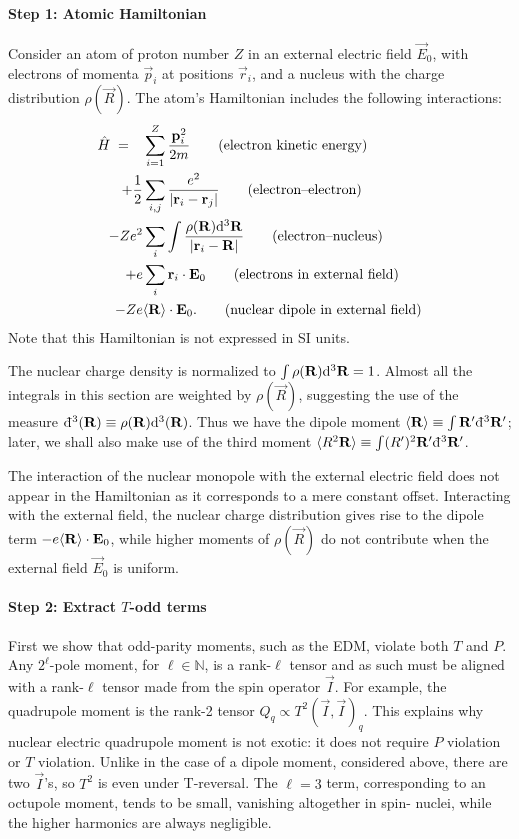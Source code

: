 \paragraph{Step 1: Atomic Hamiltonian}

Consider an atom of proton number $Z$ in an external electric field $\vec E_0$,
with electrons of momenta $\vec p_i$ at positions $\vec r_i$, and a nucleus with
the charge distribution $\rho(\vec R)$. The atom's Hamiltonian includes the
following interactions:
%
\begin{align*}
    \hat H\;=\quad
    &\sum_{i=1}^Z\frac{\mathbf{p}_i^2}{2m}
        \tag{electron kinetic energy}\\
    +\frac{1}{2}&\sum\limits_{i,j}\frac{e^2}{|\mathbf{r}_i-\mathbf{r}_j|}
        \tag{electron--electron}\\
    -Ze^2&\sum_i\int\frac{\rho(\mathbf{R})\mathrm{d}^3\mathbf{R}}{|\mathbf{r}_i-\mathbf{R}|}
        \tag{electron--nucleus}\\
    +e&\sum_i\mathbf{r}_i\cdot\mathbf{E}_0
        \tag{electrons in external field}\\
    -Ze&\langle \mathbf{R}\rangle\cdot\mathbf{E}_0.
        \tag{nuclear dipole in external field}
\end{align*}
%
Note that this Hamiltonian is not expressed in SI units.

The nuclear charge density is normalized to $\int\rho(\mathbf{R})\mathrm{d}^3\mathbf{R}=1$.
Almost all the integrals in this section are weighted by $\rho(\vec R)$,
suggesting the use of the measure $\mathrm{d}\hspace*{-0.15em}\bar{}\hspace*{0.2em}^3(\mathbf{R})\equiv\rho(\mathbf{R})\mathrm{d}^3(\mathbf{R})$.
Thus we have the dipole moment $\langle \mathbf{R}\rangle\equiv\int\mathbf{R}'\mathrm{d}\hspace*{-0.15em}\bar{}\hspace*{0.2em}^3\mathbf{R}'$;
later, we shall also make use of the third moment $\langle R^2\mathbf{R}\rangle\equiv\int
(R')^2\mathbf{R}'\mathrm{d}\hspace*{-0.15em}\bar{}\hspace*{0.2em}^3\mathbf{R}'$.

The interaction of the nuclear monopole with the external electric field does
not appear in the Hamiltonian as it corresponds to a mere constant offset.
Interacting with the external field, the nuclear charge distribution gives rise
to the dipole term $-e\langle \mathbf{R}\rangle\cdot\mathbf{E}_0$, while higher moments of
$\rho(\vec R)$ do not contribute when the external field $\vec E_0$ is uniform.

\paragraph{Step 2: Extract $T$-odd terms}

First we show that odd-parity moments, such as the \gls{EDM}, violate both $T$
and $P$. Any $2^\ell$-pole moment, for $\ell\in\mathbb{N}$, is a rank-$\ell$
tensor and as such must be aligned with a rank-$\ell$ tensor made from the spin
operator $\vec I$. For example, the quadrupole moment is the rank-2 tensor
$Q_q\propto T^2(\vec I,\vec I)_q$. This explains why nuclear electric quadrupole
moment is not exotic: it does not require $P$ violation or $T$ violation. Unlike
in the case of a dipole moment, considered above, there are two $\vec I$'s, so
$T^2$ is even under T-reversal. The $\ell=3$ term, corresponding to an octupole
moment, tends to be small, vanishing altogether in spin- nuclei,
while the higher harmonics are always negligible. \cite{flambaum2002nuclear}

